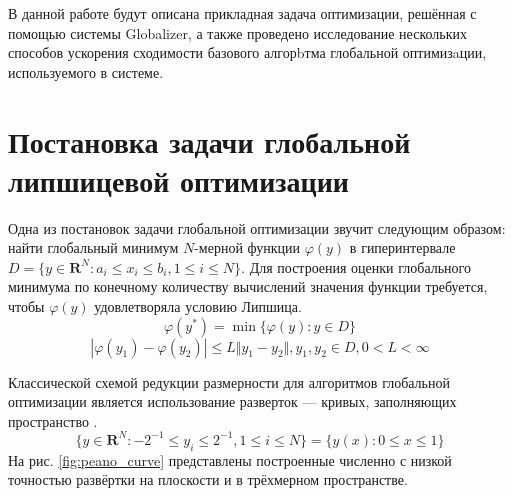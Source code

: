 В данной работе будут описана прикладная задача оптимизации, решённая с помощью системы
Globalizer, а также проведено исследование нескольких способов ускорения сходимости
базового алгорbтма глобальной оптимизaции, используемого в системе.

\section{Постановка задачи глобальной липшицевой оптимизации}
Одна из постановок задачи глобальной оптимизации звучит следующим образом: найти
глобальный минимум \(N\)-мерной функции \(\varphi(y)\) в гиперинтервале
\(D=\{y\in \mathbf{R}^N:a_i\leqslant x_i\leqslant{b_i}, 1\leqslant{i}\leqslant{N}\}\).
Для построения оценки глобального минимума по конечному количеству вычислений
значения функции требуется, чтобы \(\varphi(y)\) удовлетворяла условию Липшица.
\begin{displaymath}
\label{task}
\varphi(y^*)=\min\{\varphi(y):y\in D\}
\end{displaymath}
\begin{displaymath}
\label{lip}
|\varphi(y_1)-\varphi(y_2)|\leqslant L\Vert y_1-y_2\Vert,y_1,y_2\in D,0<L<\infty
\end{displaymath}

Классической схемой редукции размерности для алгоритмов глобальной оптимизации является
использование разверток --- кривых, заполняющих пространство \cite{strOptBook}.
\begin{displaymath}
\label{cube}
\lbrace y\in \mathbf{R}^N:-2^{-1}\leqslant y_i\leqslant 2^{-1},1\leqslant i\leqslant N\rbrace=\{y(x):0\leqslant x\leqslant 1\}
\end{displaymath}
На рис. \ref{fig:peano_curve} представлены построенные численно с низкой точностью развёртки на плоскости и
в трёхмерном пространстве.

